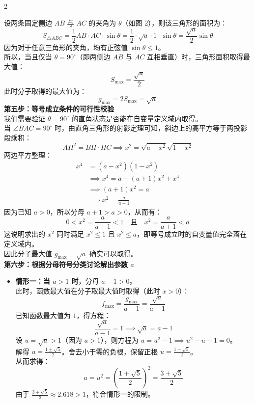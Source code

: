 \documentclass[11pt,a4paper]{ctexart}
\begin{document}
\begin{paracol}{2}
{  设两条固定侧边 $AB$ 与 $AC$ 的夹角为 $\theta$（如图 2），则该三角形的面积为：
  $$S_{\triangle ABC} = \frac{1}{2} AB \cdot AC \cdot \sin\theta = \frac{1}{2} \cdot \sqrt{a} \cdot 1 \cdot \sin\theta = \frac{\sqrt{a}}{2}\sin\theta$$
  因为对于任意三角形的夹角，均有正弦值 $\sin\theta \le 1$。\\
  所以，当且仅当 $\theta = 90^\circ$（即两侧边 $AB$ 与 $AC$ 互相垂直）时，三角形面积取得最大值：
  $$S_{\max} = \frac{\sqrt{a}}{2}$$
  此时分子取得的最大值为：
  $$g_{\max} = 2S_{\max} = \sqrt{a}$$
  \textbf{第五步：等号成立条件的可行性校验}\\
  我们需要验证 $\theta = 90^\circ$ 的直角状态是否能在自变量定义域内取得。\\
  当 $\angle BAC = 90^\circ$ 时，由直角三角形的射影定理可知，斜边上的高平方等于两投影段乘积：
  $$AH^2 = BH \cdot HC \implies x^2 = \sqrt{a-x^2}\sqrt{1-x^2}$$
  两边平方整理：
  $$\begin{aligned}
    x^4 &= (a-x^2)(1-x^2) \\
    &\implies x^4 = a - (a+1)x^2 + x^4 \\
    &\implies (a+1)x^2 = a \\
    &\implies x^2 = \frac{a}{a+1}
  \end{aligned}$$
  因为已知 $a > 0$，所以分母 $a+1 > a > 0$，从而有：
  $$0 < x^2 = \frac{a}{a+1} < 1 \quad \text{且} \quad x^2 = \frac{a}{a+1} < a$$
  这说明求出的 $x^2$ 同时满足 $x^2 \le 1$ 且 $x^2 \le a$，即等号成立时的自变量值完全落在定义域内。\\
  因此分子最大值 $g_{\max} = \sqrt{a}$ 确实可以取得。\\[0.3em]
  \textbf{第六步：根据分母符号分类讨论解出参数 $a$}
  \begin{itemize}
    \item \textbf{情形一：当 $a > 1$ 时}，分母 $a-1 > 0$。\\
          此时，函数最大值在分子取最大值时取得（此时 $x > 0$）：
          $$f_{\max} = \frac{g_{\max}}{a-1} = \frac{\sqrt{a}}{a-1}$$
          已知函数最大值为 $1$，得方程：
          $$\frac{\sqrt{a}}{a-1} = 1 \implies \sqrt{a} = a - 1$$
          设 $u = \sqrt{a} > 1$（因为 $a > 1$），则方程为 $u = u^2 - 1 \implies u^2 - u - 1 = 0$。\\
          解得 $u = \frac{1 \pm \sqrt{5}}{2}$。舍去小于零的负根，保留正根 $u = \frac{1+\sqrt{5}}{2}$。\\
          从而求得：
          $$a = u^2 = \left(\frac{1+\sqrt{5}}{2}\right)^2 = \frac{3+\sqrt{5}}{2}$$
          由于 $\frac{3+\sqrt{5}}{2} \approx 2.618 > 1$，符合情形一的限制。

\end{itemize}}
\end{paracol}
\end{document}
